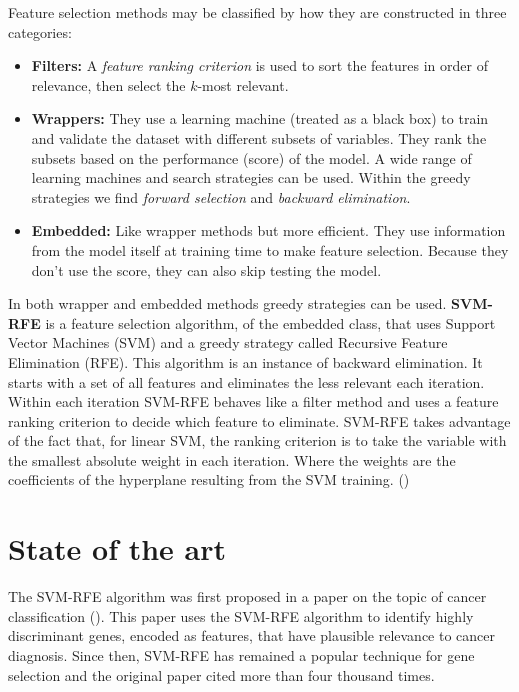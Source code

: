Feature selection methods may be classified by how they are constructed in three categories:

\begin{itemize}
    \item \textbf{Filters:} A \emph{feature ranking criterion} is used to sort the features in order of rel\-e\-vance, then select the $k$-most relevant.
    \item \textbf{Wrappers:} They use a learning machine (treated as a black box) to train and validate the dataset with different subsets of variables. They rank the subsets based on the performance (score) of the model. A wide range of learning machines and search strategies can be used. Within the greedy strategies we find \emph{forward selection} and \emph{backward elimination}.
    \item \textbf{Embedded:} Like wrapper methods but more efficient. They use information from the model itself at training time to make feature selection. Because they don't use the score, they can also skip testing the model.
\end{itemize}

In both wrapper and embedded methods greedy strategies can be used. \textbf{SVM-RFE} is a feature selection algorithm, of the embedded class, that uses Support Vector Machines (SVM) and a greedy strategy called Recursive Feature Elimination (RFE). This algorithm is an instance of backward elimination. It starts with a set of all features and eliminates the less relevant each iteration. Within each iteration SVM-RFE behaves like a filter method and uses a feature ranking criterion to decide which feature to eliminate. SVM-RFE takes advantage of the fact that, for linear SVM, the ranking criterion is to take the variable with the smallest absolute weight in each iteration. Where the weights are the co\-ef\-fi\-cients of the hyperplane resulting from the SVM training.  (\cite{guyon_introduction_2003})


\section{State of the art}

The SVM-RFE algorithm was first proposed in a paper on the topic of cancer class\-ification (\cite{guyon_gene_2002}). This paper uses the SVM-RFE algorithm to identify highly discriminant genes, encoded as features, that have plausible relevance to cancer diagnosis. Since then, SVM-RFE has remained a popular technique for gene selection and the original paper cited more than four thousand times.

